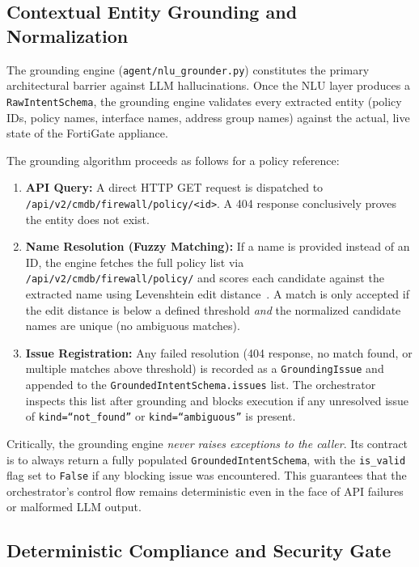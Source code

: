 \subsection{Contextual Entity Grounding and Normalization}
\label{subsec:grounding}

The grounding engine (\texttt{agent/nlu\_grounder.py}) constitutes the primary architectural barrier against LLM hallucinations. Once the NLU layer produces a \texttt{RawIntentSchema}, the grounding engine validates every extracted entity (policy IDs, policy names, interface names, address group names) against the actual, live state of the FortiGate appliance.

The grounding algorithm proceeds as follows for a policy reference:

\begin{enumerate}
    \item \textbf{API Query:} A direct HTTP GET request is dispatched to
    \texttt{/api/v2/cmdb/firewall/\allowbreak{}policy/<id>}.
    A 404 response conclusively proves the entity does not exist.
    \item \textbf{Name Resolution (Fuzzy Matching):} If a name is provided instead of an ID, the engine fetches the full policy list via \texttt{/api/v2/cmdb/firewall/policy/} and scores each candidate against the extracted name using Levenshtein edit distance~\cite{navarro2001guided}. A match is only accepted if the edit distance is below a defined threshold \emph{and} the normalized candidate names are unique (no ambiguous matches).
    \item \textbf{Issue Registration:} Any failed resolution (404 response, no match found, or multiple matches above threshold) is recorded as a \texttt{GroundingIssue} and appended to the \texttt{GroundedIntentSchema.issues} list. The orchestrator inspects this list after grounding and blocks execution if any unresolved issue of \texttt{kind=``not\_found''} or \texttt{kind=``ambiguous''} is present.
\end{enumerate}

Critically, the grounding engine \emph{never raises exceptions to the caller}. Its contract is to always return a fully populated \texttt{GroundedIntentSchema}, with the \texttt{is\_valid} flag set to \texttt{False} if any blocking issue was encountered. This guarantees that the orchestrator's control flow remains deterministic even in the face of API failures or malformed LLM output.

\subsection{Deterministic Compliance and Security Gate}
\label{subsec:compliance}

